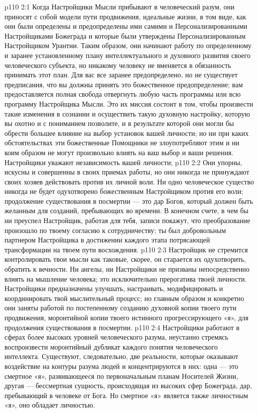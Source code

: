 \vs p110 2:1 Когда Настройщики Мысли прибывают в человеческий разум, они приносят с собой модели пути продвижения, идеальные жизни, в том виде, как они были определены и предопределены ими самими и Персонализированными Настройщиками Божеграда и которые были утверждены Персонализированным Настройщиком Урантии. Таким образом, они начинают работу по определенному и заранее установленному плану интеллектуального и духовного развития своего человеческого субъекта, но никакому человеку не вменяется в обязанность принимать этот план. Для вас все заранее предопределено, но не существует предписания, что вы должны принять это божественное предопределение; вам предоставляется полная свобода отвергнуть любую часть программы или всю программу Настройщика Мысли. Это их миссия состоит в том, чтобы произвести такие изменения в сознании и осуществить такую духовную настройку, которую вы охотно и с пониманием позволите, и в результате которой они могли бы обрести большее влияние на выбор установок вашей личности; но ни при каких обстоятельствах эти божественные Помощники не злоупотребляют этим и ни коим образом не могут произвольно влиять на ваш выбор и ваши решения. Настройщики уважают независимость вашей личности; 
\vs p110 2:2 Они упорны, искусны и совершенны в своих приемах работы, но они никогда не принуждают своих хозяев действовать против их личной воли. Ни одно человеческое существо никогда не будет одухотворено божественным Настройщиком против его воли; продолжение существования в посмертии --- это дар Богов, который должен быть желанным для созданий, пребывающих во времени. В конечном счете, в чем бы ни преуспел Настройщик, работая для тебя, записи покажут, что преобразование произошло по твоему согласию к сотрудничеству; ты был добровольным партнером Настройщика в достижении каждого этапа потрясающей трансформации на твоем пути восхождения.
\vs p110 2:3 \pc Настройщик не стремится контролировать твои мысли как таковые, скорее, он старается их одухотворить, обратить к вечности. Ни ангелы, ни Настройщики не призваны непосредственно влиять на мышление человека; это исключительно прерогатива твоей личности. Настройщики предназначены улучшать, настраивать, модифицировать и координировать твой мыслительный процесс; но главным образом и конкретно они заняты работой по постепенному созданию духовной копии твоего пути продвижения, моронтийной копии твоего истинного прогрессирующего «я», для продолжения существования в посмертии.
\vs p110 2:4 Настройщики работают в сферах более высоких уровней человеческого разума, неустанно стремясь воспроизвести моронтийный дубликат каждого понятия человеческого интеллекта. Существуют, следовательно, две реальности, которые оказывают воздействие на контуры разума людей и концентрируются в них: одна --- это смертное «я», развивающееся по первоначальным планам Носителей Жизни, другая --- бессмертная сущность, происходящая из высоких сфер Божеграда, дар, пребывающий в человеке от Бога. Но смертное «я» является также личностным «я», оно обладает личностью.
